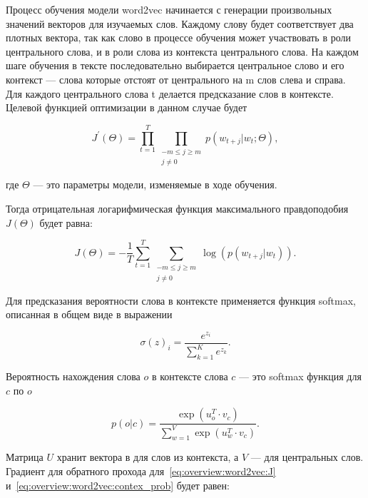 Процесс обучения модели word2vec начинается с генерации произвольных значений векторов для изучаемых слов. Каждому слову будет соответствует два плотных вектора, так как слово в процессе обучения может участвовать в роли центрального слова, и в роли слова из контекста центрального слова. На каждом шаге обучения в тексте последовательно выбирается центральное слово и его контекст --- слова которые отстоят от центрального на m слов слева и справа. Для каждого центрального слова t делается предсказание слов в контексте\cite{word2vec}. Целевой функцией оптимизации в данном случае будет

\begin{equation} \label{eq:overview:word2vec:Jprime}
  J^{\prime}(\Theta) = \prod_{t=1}^{T}\prod_{\substack{-m\leq j \geq m\\j \neq 0}}p(w_{t+j}|w_{t};\Theta),
\end{equation}
\begin{explanationx}
\item [где] $ \Theta $ --- это параметры модели, изменяемые в ходе обучения.
\end{explanationx}


Тогда отрицательная логарифмическая функция максимального правдоподобия $ J(\Theta) $ будет равна:

\begin{equation} \label{eq:overview:word2vec:J}
  J(\Theta) = -\frac{1}{T}\sum_{t=1}^{T}\sum_{\substack{-m\leq j \geq m\\j \neq 0}}\log(p(w_{t+j}|w_{t})).
\end{equation}

Для предсказания вероятности слова в контексте применяется функция softmax, описанная в общем виде в выражении

\begin{equation}
  \label{eq:overview:softmax}
  {\sigma(z)}_i = \frac{e^{z_i}}{\sum_{k=1}^{K}e^{z_k}}.
\end{equation}

Вероятность нахождения слова $o$ в контексте слова $c$ --- это softmax функция для $c$ по $o$

\begin{equation}
  \label{eq:overview:word2vec:contex_prob}
  p(o|c) = \frac{\exp({u_{o}^T}\cdot{v_{c}})}{\sum_{w=1}^{V}\exp({u_w^T}\cdot{v_{c}})}.
\end{equation}

Матрица $U$ хранит вектора в для слов из контекста, а $V$ --- для центральных слов.
Градиент для обратного прохода для~\ref{eq:overview:word2vec:J} и~\ref{eq:overview:word2vec:contex_prob} будет равен:

